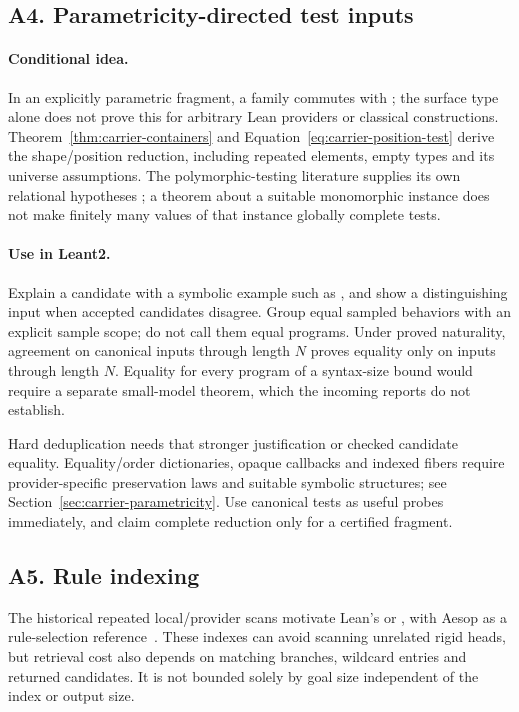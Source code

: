 \subsection{A4. Parametricity-directed test inputs}

\paragraph{Conditional idea.} In an explicitly parametric fragment, a family
 commutes with ; the surface
type alone does not prove this for arbitrary Lean providers or classical
constructions. Theorem~\ref{thm:carrier-containers} and
Equation~\ref{eq:carrier-position-test} derive the shape/position reduction,
including repeated elements, empty types and its universe assumptions.
The polymorphic-testing literature supplies its own relational hypotheses
\cite{wadler89,bernardy10}; a theorem about a suitable monomorphic instance
does not make finitely many values of that instance globally complete tests.

\paragraph{Use in Leant2.} Explain a candidate with a symbolic example such as
\code{[0,1,2] |-> [2,1,0]}, and show a distinguishing input when accepted
candidates disagree. Group equal sampled behaviors with an explicit sample
scope; do not call them equal programs. Under proved naturality, agreement on
canonical inputs through length $N$ proves equality only on inputs through
length $N$. Equality for every program of a syntax-size bound would require a
separate small-model theorem, which the incoming reports do not establish.

Hard deduplication needs that stronger justification or checked candidate
equality. Equality/order dictionaries, opaque callbacks and indexed fibers
require provider-specific preservation laws and suitable symbolic structures;
see Section~\ref{sec:carrier-parametricity}. Use canonical tests as useful
probes immediately, and claim complete reduction only for a certified fragment.

\subsection{A5. Rule indexing}

The historical repeated local/provider scans motivate Lean's 
or , with Aesop as a rule-selection reference~\cite{aesop,aesopreadme}.
These indexes can avoid scanning unrelated rigid heads, but retrieval cost also
depends on matching branches, wildcard entries and returned candidates. It is
not bounded solely by goal size independent of the index or output size.

